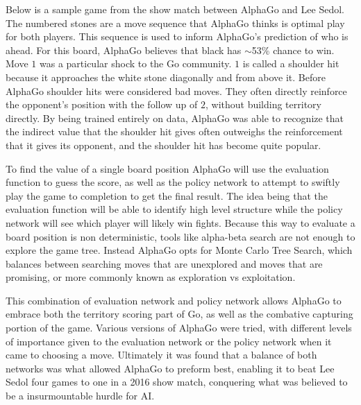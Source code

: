 \documentclass[12pt]{IEEEtran}
\begin{document}
\par Below is a sample game from the show match between AlphaGo and Lee Sedol. The numbered stones are a move sequence that AlphaGo thinks is optimal play for both players. This sequence is used to inform AlphaGo's prediction of who is ahead. For this board, AlphaGo believes that black has $\sim$53\% chance to win. Move $1$ was a particular shock to the Go community. $1$ is called a shoulder hit because it approaches the white stone diagonally and from above it. Before AlphaGo shoulder hits were considered bad moves. They often directly reinforce the opponent's position with the follow up of $2$, without building territory directly. By being trained entirely on data, AlphaGo was able to recognize that the indirect value that the shoulder hit gives often outweighs the reinforcement that it gives its opponent, and the shoulder hit has become quite popular. 

\scalebox{0.5}{\showgoban} 
\cleargoban

\par To find the value of a single board position AlphaGo will use the evaluation function to guess the score, as well as the policy network to attempt to swiftly play the game to completion to get the final result. The idea being that the evaluation function will be able to identify high level structure while the policy network will see which player will likely win fights. Because this way to evaluate a board position is non deterministic, tools like alpha-beta search are not enough to explore the game tree. Instead AlphaGo opts for Monte Carlo Tree Search, which balances between searching moves that are unexplored and moves that are promising, or more commonly known as exploration vs exploitation.\cite{AlphaGo}

\par This combination of evaluation network and policy network allows AlphaGo to embrace both the territory scoring part of Go, as well as the combative capturing portion of the game. Various versions of AlphaGo were tried, with different levels of importance given to the evaluation network or the policy network when it came to choosing a move. Ultimately it was found that a balance of both networks was what allowed AlphaGo to preform best,\cite{AlphaGo} enabling it to beat Lee Sedol four games to one in a 2016 show match, conquering what was believed to be a insurmountable hurdle for AI. 
\end{document}
